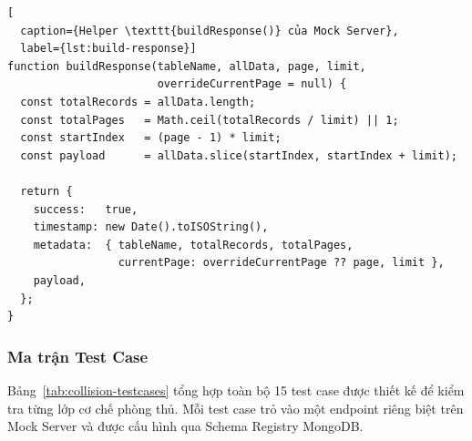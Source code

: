 \begin{lstlisting}[
  caption={Helper \texttt{buildResponse()} của Mock Server},
  label={lst:build-response}]
function buildResponse(tableName, allData, page, limit,
                       overrideCurrentPage = null) {
  const totalRecords = allData.length;
  const totalPages   = Math.ceil(totalRecords / limit) || 1;
  const startIndex   = (page - 1) * limit;
  const payload      = allData.slice(startIndex, startIndex + limit);

  return {
    success:   true,
    timestamp: new Date().toISOString(),
    metadata:  { tableName, totalRecords, totalPages,
                 currentPage: overrideCurrentPage ?? page, limit },
    payload,
  };
}
\end{lstlisting}

\subsubsection{Ma trận Test Case}

Bảng~\ref{tab:collision-testcases} tổng hợp toàn bộ 15 test case
được thiết kế để kiểm tra từng lớp cơ chế phòng thủ. Mỗi test
case trỏ vào một endpoint riêng biệt trên Mock Server và được cấu
hình qua Schema Registry MongoDB.

